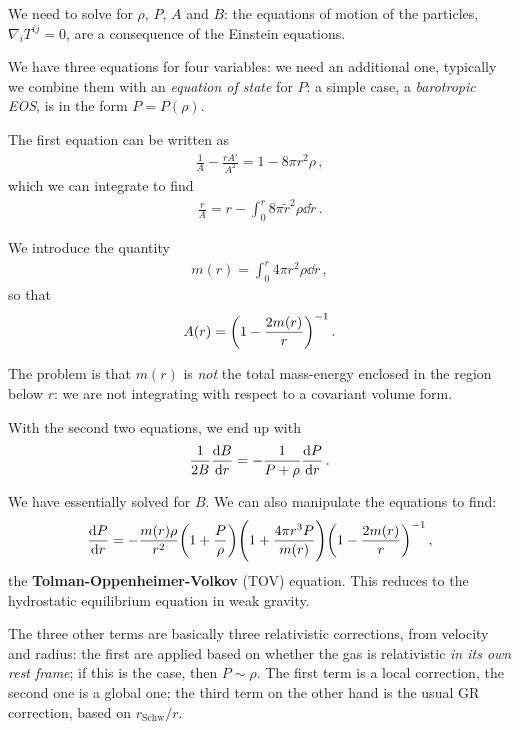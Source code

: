 \documentclass[main.tex]{subfiles}
\begin{document}
We need to solve for \(\rho \), \(P\), \(A\) and \(B\): the equations of motion of the particles, \(\nabla_{i} T^{ij} = 0\), are a consequence of the Einstein equations. 

We have three equations for four variables: we need an additional one, typically we combine them with an \emph{equation of state} for \(P\): a simple case, a \emph{barotropic EOS}, is in the form \(P = P(\rho )\).

The first equation can be written as 
%
\begin{align}
\frac{1}{A} - \frac{r A'}{A^2} = 1 - 8 \pi r^2 \rho 
\,,
\end{align}
%
which we can integrate to find 
%
\begin{align}
\frac{r}{A} = r - \int_{0}^{r} 8 \pi \widetilde{r}^2\rho \dd{\widetilde{r}}
\,.
\end{align}

We introduce the quantity 
%
\begin{align}
m(r) = \int_{0}^{r} 4 \pi r^2 \rho \dd{r}
\,,
\end{align}
%
so that
%
\begin{align}
A(r) = \qty(1 - \frac{2 m(r)}{r})^{-1}
\,.
\end{align}

The problem is that \(m(r)\) is \emph{not} the total mass-energy enclosed in the region below \(r\): we are not integrating with respect to a covariant volume form.

With the second two equations, we end up with 
%
\begin{align}
\frac{1}{2B} \dv{B}{r} = - \frac{1}{P + \rho } \dv{P}{r}
\,.
\end{align}

We have essentially solved for \(B\). 
We can also manipulate the equations to find:
%
\begin{align}
\dv{P}{r} = - \frac{m(r) \rho }{r^2} \qty(1 + \frac{P}{\rho })
\qty(1 + \frac{4 \pi r^3 P}{m(r)}) \qty(1 - \frac{2 m(r)}{r})^{-1}
\,,
\end{align}
%
the \textbf{Tolman-Oppenheimer-Volkov} (TOV) equation. 
This reduces to the hydrostatic equilibrium equation in weak gravity.

The three other terms are basically three relativistic corrections, from velocity and radius: the first are applied based on whether the gas is relativistic \emph{in its own rest frame}; if this is the case, then \(P \sim \rho \).
The first term is a local correction, the second one is a global one; the third term on the other hand is the usual GR correction, based on \(r _{\text{Schw}} / r\). 
\end{document}
